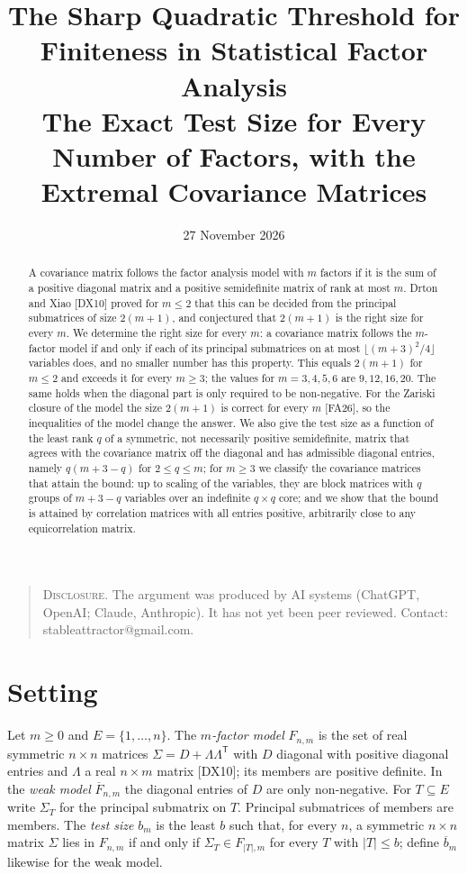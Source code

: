 \documentclass[11pt,letterpaper,reqno]{amsart}
\title[The Sharp Quadratic Threshold for Finiteness in Statistical Factor Analysis]{The Sharp Quadratic Threshold for Finiteness in Statistical Factor Analysis\\[6pt] {\mdseries\small The Exact Test Size for Every Number of Factors, with the Extremal Covariance Matrices}}
\date{27 November 2026}
\theoremstyle{spaced}
\begin{document}
\begin{abstract}
A covariance matrix follows the factor analysis model with \(m\) factors if it is the sum of a positive diagonal matrix and a positive semidefinite matrix of rank at most \(m\). Drton and Xiao {[}DX10{]} proved for \(m \le 2\) that this can be decided from the principal submatrices of size \(2(m+1)\), and conjectured that \(2(m+1)\) is the right size for every \(m\). We determine the right size for every \(m\): a covariance matrix follows the \(m\)-factor model if and only if each of its principal submatrices on at most \(\lfloor (m+3)^2/4 \rfloor\) variables does, and no smaller number has this property. This equals \(2(m+1)\) for \(m \le 2\) and exceeds it for every \(m \ge 3\); the values for \(m = 3, 4, 5, 6\) are \(9, 12, 16, 20\). The same holds when the diagonal part is only required to be non-negative. For the Zariski closure of the model the size \(2(m+1)\) is correct for every \(m\) {[}FA26{]}, so the inequalities of the model change the answer. We also give the test size as a function of the least rank \(q\) of a symmetric, not necessarily positive semidefinite, matrix that agrees with the covariance matrix off the diagonal and has admissible diagonal entries, namely \(q(m+3-q)\) for \(2 \le q \le m\); for \(m \ge 3\) we classify the covariance matrices that attain the bound: up to scaling of the variables, they are block matrices with \(q\) groups of \(m+3-q\) variables over an indefinite \(q \times q\) core; and we show that the bound is attained by correlation matrices with all entries positive, arbitrarily close to any equicorrelation matrix.

\end{abstract}
\maketitle
\begin{quote}\small
\textsc{Disclosure.} The argument was produced by AI systems (ChatGPT, OpenAI; Claude, Anthropic). It has not yet been peer reviewed. Contact: stableattractor@gmail.com.

\end{quote}
\smallskip
\hypertarget{setting}{%
\section{Setting}\label{setting}}

Let \(m \ge 0\) and \(E = \{1, \dots, n\}\). The \emph{\(m\)-factor model} \(F_{n,m}\) is the set of real symmetric \(n \times n\) matrices \(\Sigma = D + \Lambda\Lambda^{\mathsf T}\) with \(D\) diagonal with positive diagonal entries and \(\Lambda\) a real \(n \times m\) matrix {[}DX10{]}; its members are positive definite. In the \emph{weak model} \(\overline{F}_{n,m}\) the diagonal entries of \(D\) are only non-negative. For \(T \subseteq E\) write \(\Sigma_T\) for the principal submatrix on \(T\). Principal submatrices of members are members. The \emph{test size} \(b_m\) is the least \(b\) such that, for every \(n\), a symmetric \(n \times n\) matrix \(\Sigma\) lies in \(F_{n,m}\) if and only if \(\Sigma_T \in F_{\lvert T\rvert, m}\) for every \(T\) with \(\lvert T\rvert \le b\); define \(\overline{b}_m\) likewise for the weak model.
\end{document}
